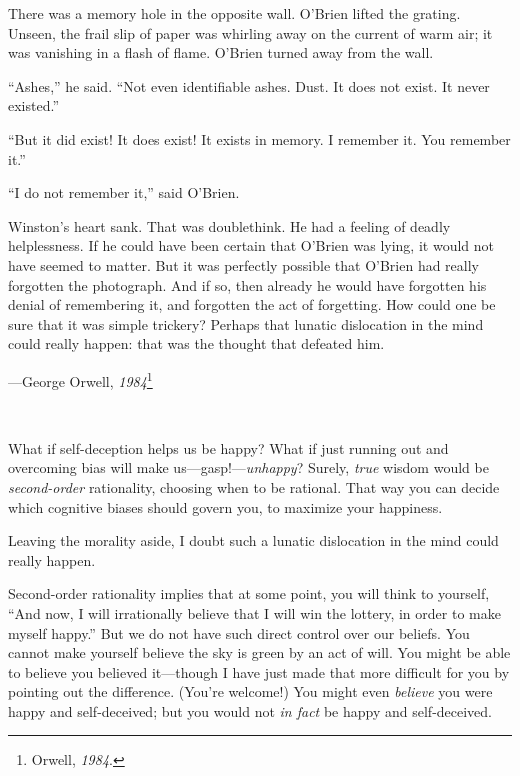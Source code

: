 {
 There was a memory hole in the opposite wall.
O'Brien lifted the grating. Unseen, the frail slip of
paper was whirling away on the current of warm air; it was vanishing in
a flash of flame. O'Brien turned away from the wall.}

{
 ``Ashes,'' he said.
``Not even identifiable ashes. Dust. It does not
exist. It never existed.''}

{
 ``But it did exist! It does exist! It exists in
memory. I remember it. You remember it.''}

{
 ``I do not remember it,'' said
O'Brien.}

{
 Winston's heart sank. That was doublethink. He had
a feeling of deadly helplessness. If he could have been certain that
O'Brien was lying, it would not have seemed to matter.
But it was perfectly possible that O'Brien had really
forgotten the photograph. And if so, then already he would have
forgotten his denial of remembering it, and forgotten the act of
forgetting. How could one be sure that it was simple trickery? Perhaps
that lunatic dislocation in the mind could really happen: that was the
thought that defeated him.}

{\raggedleft
 {}---George Orwell, \textit{1984}\footnote{Orwell, \textit{1984}.}
\par}


\bigskip

{
 ~}

{
 What if self-deception helps us be happy? What if just running out
and overcoming bias will make us---gasp!---\textit{unhappy}? Surely,
\textit{true} wisdom would be \textit{second-order} rationality,
choosing when to be rational. That way you can decide which cognitive
biases should govern you, to maximize your happiness.}

{
 Leaving the morality aside, I doubt such a lunatic dislocation in
the mind could really happen.}

{
 Second-order rationality implies that at some point, you will
think to yourself, ``And now, I will irrationally
believe that I will win the lottery, in order to make myself
happy.'' But we do not have such direct control over
our beliefs. You cannot make yourself believe the sky is green by an
act of will. You might be able to believe you believed it---though I
have just made that more difficult for you by pointing out the
difference. (You're welcome!) You might even
\textit{believe} you were happy and self-deceived; but you would not
\textit{in fact} be happy and self-deceived.}


